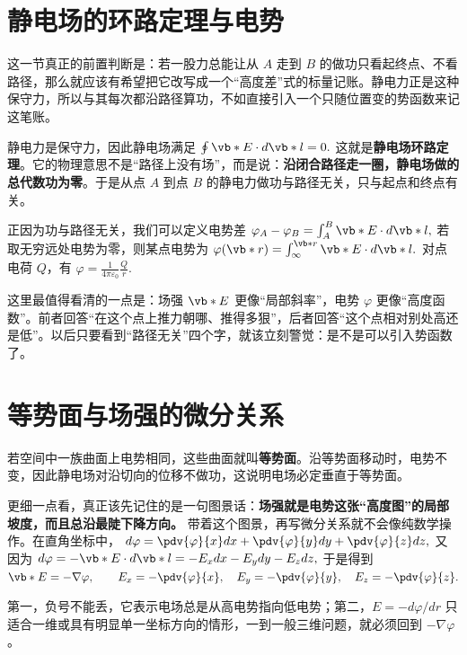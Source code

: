 \documentclass[lang=cn,11pt]{elegantbook}
\newcommand{\bridge}[1]{\begin{note}#1\end{note}}
\begin{document}
\section{静电场的环路定理与电势}

这一节真正的前置判断是：若一股力总能让从 \(A\) 走到 \(B\) 的做功只看起终点、不看路径，那么就应该有希望把它改写成一个“高度差”式的标量记账。静电力正是这种保守力，所以与其每次都沿路径算功，不如直接引入一个只随位置变的势函数来记这笔账。

静电力是保守力，因此静电场满足
 \(\oint \vb*{E}\cdot d\vb*{l}=0.\) 
这就是\textbf{静电场环路定理}。它的物理意思不是“路径上没有场”，而是说：\textbf{沿闭合路径走一圈，静电场做的总代数功为零}。于是从点 \(A\) 到点 \(B\) 的静电力做功与路径无关，只与起点和终点有关。

正因为功与路径无关，我们可以定义电势差
 \(\varphi_A-\varphi_B =\int_A^B \vb*{E}\cdot d\vb*{l},\) 
若取无穷远处电势为零，则某点电势为
 \(\varphi(\vb*{r})=\int_{\infty}^{\vb*{r}} \vb*{E}\cdot d\vb*{l}.\) 
对点电荷 \(Q\)，有
 \(\varphi=\frac{1}{4\pi\varepsilon_0}\frac{Q}{r}.\) 

\bridge{这里最值得看清的一点是：场强 \(\vb*{E}\) 更像“局部斜率”，电势 \(\varphi\) 更像“高度函数”。前者回答“在这个点上推力朝哪、推得多狠”，后者回答“这个点相对别处高还是低”。以后只要看到“路径无关”四个字，就该立刻警觉：是不是可以引入势函数了。}

\section{等势面与场强的微分关系}

若空间中一族曲面上电势相同，这些曲面就叫\textbf{等势面}。沿等势面移动时，电势不变，因此静电场对沿切向的位移不做功，这说明电场必定垂直于等势面。

更细一点看，真正该先记住的是一句图景话：\textbf{场强就是电势这张“高度图”的局部坡度，而且总沿最陡下降方向。} 带着这个图景，再写微分关系就不会像纯数学操作。在直角坐标中，
 \(d\varphi=\pdv{\varphi}{x}dx+\pdv{\varphi}{y}dy+\pdv{\varphi}{z}dz,\) 
又因为
 \(d\varphi=-\vb*{E}\cdot d\vb*{l} =-E_xdx-E_ydy-E_zdz,\) 
于是得到
 \(\vb*{E}=-\nabla \varphi, \qquad E_x=-\pdv{\varphi}{x},\quad E_y=-\pdv{\varphi}{y},\quad E_z=-\pdv{\varphi}{z}.\) 

\begin{note}
 第一，负号不能丢，它表示电场总是从高电势指向低电势；第二，\(E=-d\varphi/dr\) 只适合一维或具有明显单一坐标方向的情形，一到一般三维问题，就必须回到 \(-\nabla\varphi\)。
\end{note}
\end{document}
